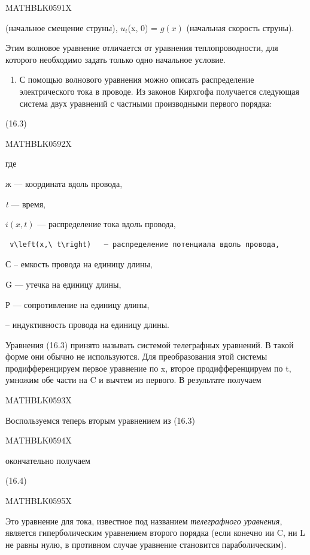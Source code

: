 \documentclass[
]{article}
\providecommand{\tightlist}{%
  \setlength{\itemsep}{0pt}\setlength{\parskip}{0pt}}
\begin{document}
{{MATHBLK0591X

(начальное смещение струны), \(u_t\)(x, 0) = \(g(x)\) (начальная
скорость струны).

Этим волновое уравнение отличается от уравнения теплопроводности, для
которого необходимо задать только одно начальное условие.

\begin{enumerate}
\def\labelenumi{\arabic{enumi}.}
\setcounter{enumi}{3}
\tightlist
\item
  С помощью волнового уравнения можно описать распределение
  электрического тока в проводе. Из законов Кирхгофа получается
  следующая система двух уравнений с частными производными первого
  порядка:
\end{enumerate}

(16.3)

MATHBLK0592X

где

ж --- координата вдоль провода,

\emph{t} --- время,

\(i(x, t)\) --- распределение тока вдоль провода,

\begin{verbatim}
 v\left(x,\ t\right)   — распределение потенциала вдоль провода,
\end{verbatim}

С -- емкость провода на единицу длины,

G --- утечка на единицу длины,

Р --- сопротивление на единицу длины,

-- индуктивность провода на единицу длины.

Уравнения (16.3) принято называть системой телеграфных уравнений. В
такой форме они обычно не используются. Для преобразования этой системы
продифференцируем первое уравнение по x, второе продифференцируем по t,
умножим обе части на C и вычтем из первого. В результате получаем

MATHBLK0593X

Воспользуемся теперь вторым уравнением из (16.3)

MATHBLK0594X

окончательно получаем

(16.4)

MATHBLK0595X

Это уравнение для тока, известное под названием \emph{телеграфного
уравнения}, является гиперболическим уравнением второго порядка (если
конечно ии C, ни L не равны нулю, в противном случае уравнение
становится параболическим).

}}
\end{document}
